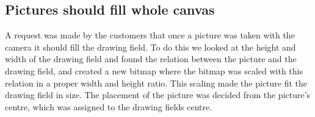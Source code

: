 \subsection{Pictures should fill whole canvas}
A request was made by the customers that once a picture was taken with the camera it should fill the drawing field.
To do this we looked at the height and width of the drawing field and found the relation between the picture and the drawing field, and created a new bitmap where the bitmap was scaled with this relation in a proper width and height ratio.
This scaling made the picture fit the drawing field in size.
The placement of the picture was decided from the picture's centre, which was assigned to the drawing fields centre.